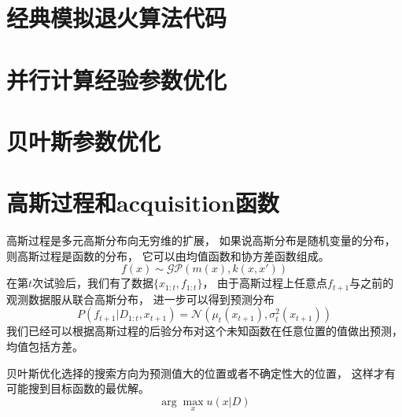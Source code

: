 \documentclass{nudt}
\begin{document}
\newpage
\nocite{*}
\printbibliography[heading=bibintoc]
\newpage
\begin{appendix}
\section{经典模拟退火算法代码}\label{appendix:SA}
\noindent{\rule{\textwidth}{0.2mm}}
\vspace{-18pt} 
\fontsize{13pt}{12.5pt}\selectfont
{
	
}
\vspace{-15pt}

\section{并行计算经验参数优化}\label{appendix:bingxing}
\noindent{\rule{\textwidth}{0.2mm}}
\vspace{-18pt} 
\fontsize{13pt}{12.5pt}\selectfont
{
	
}
\vspace{-15pt}

\section{贝叶斯参数优化}\label{appendix:bayos}
\noindent{\rule{\textwidth}{0.2mm}}
\vspace{-18pt} 
\fontsize{13pt}{12.5pt}\selectfont
{
	
}
\vspace{-15pt}
\section{高斯过程和acquisition函数}\label{appendix:guess}
高斯过程是多元高斯分布向无穷维的扩展，
如果说高斯分布是随机变量的分布，则高斯过程是函数的分布，
它可以由均值函数和协方差函数组成。
\[
	f(x)\sim \mathcal{GP}(m(x),k(x,x')) 
\]
在第$t$次试验后，我们有了数据$ \{x_{1:t},f_{1:t}\} $，
由于高斯过程上任意点$ f_{t+1} $与之前的观测数据服从联合高斯分布，
进一步可以得到预测分布
\[
	P(f_{t+1}|D_{1:t},x_{t+1}) = \mathcal{N}(\mu_t(x_{t+1}),\sigma_t^2(x_{t+1})) 
\]
我们已经可以根据高斯过程的后验分布对这个未知函数在任意位置的值做出预测，
均值包括方差。

贝叶斯优化选择的搜索方向为预测值大的位置或者不确定性大的位置，
这样才有可能搜到目标函数的最优解。
\[
	\arg\max_{x} u(x|D) 
\]

\end{appendix}
\end{document}
